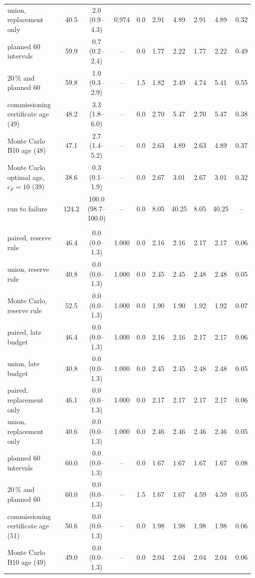\begin{table}[htbp]
\begin{tabular*}{\textwidth}{@{\extracolsep{\fill}}lccccccccc@{}}
union, replacement only & 40.5 & 2.0 (0.9--4.3) & 0.974 & 0.0 & 2.91 & 4.89 & 2.91 & 4.89 & 0.32 \\
planned 60 intervals & 59.9 & 0.7 (0.2--2.4) & -- & 0.0 & 1.77 & 2.22 & 1.77 & 2.22 & 0.49 \\
20\,\% and planned 60 & 59.8 & 1.0 (0.3--2.9) & -- & 1.5 & 1.82 & 2.49 & 4.74 & 5.41 & 0.55 \\
commissioning certificate age (49) & 48.2 & 3.3 (1.8--6.0) & -- & 0.0 & 2.70 & 5.47 & 2.70 & 5.47 & 0.38 \\
Monte Carlo B10 age (48) & 47.1 & 2.7 (1.4--5.2) & -- & 0.0 & 2.63 & 4.89 & 2.63 & 4.89 & 0.37 \\
Monte Carlo optimal age, $c_F=10$ (39) & 38.6 & 0.3 (0.1--1.9) & -- & 0.0 & 2.67 & 3.01 & 2.67 & 3.01 & 0.32 \\
run to failure & 124.2 & 100.0 (98.7--100.0) & -- & 0.0 & 8.05 & 40.25 & 8.05 & 40.25 & -- \\
\addlinespace
\multicolumn{10}{@{}l}{\textit{evidence, cruising}} \\
paired, reserve rule & 46.4 & 0.0 (0.0--1.3) & 1.000 & 0.0 & 2.16 & 2.16 & 2.17 & 2.17 & 0.06 \\
union, reserve rule & 40.8 & 0.0 (0.0--1.3) & 1.000 & 0.0 & 2.45 & 2.45 & 2.48 & 2.48 & 0.05 \\
Monte Carlo, reserve rule & 52.5 & 0.0 (0.0--1.3) & 1.000 & 0.0 & 1.90 & 1.90 & 1.92 & 1.92 & 0.07 \\
paired, late budget & 46.4 & 0.0 (0.0--1.3) & 1.000 & 0.0 & 2.16 & 2.16 & 2.17 & 2.17 & 0.06 \\
union, late budget & 40.8 & 0.0 (0.0--1.3) & 1.000 & 0.0 & 2.45 & 2.45 & 2.48 & 2.48 & 0.05 \\
paired, replacement only & 46.1 & 0.0 (0.0--1.3) & 1.000 & 0.0 & 2.17 & 2.17 & 2.17 & 2.17 & 0.06 \\
union, replacement only & 40.6 & 0.0 (0.0--1.3) & 1.000 & 0.0 & 2.46 & 2.46 & 2.46 & 2.46 & 0.05 \\
planned 60 intervals & 60.0 & 0.0 (0.0--1.3) & -- & 0.0 & 1.67 & 1.67 & 1.67 & 1.67 & 0.08 \\
20\,\% and planned 60 & 60.0 & 0.0 (0.0--1.3) & -- & 1.5 & 1.67 & 1.67 & 4.59 & 4.59 & 0.05 \\
commissioning certificate age (51) & 50.6 & 0.0 (0.0--1.3) & -- & 0.0 & 1.98 & 1.98 & 1.98 & 1.98 & 0.06 \\
Monte Carlo B10 age (49) & 49.0 & 0.0 (0.0--1.3) & -- & 0.0 & 2.04 & 2.04 & 2.04 & 2.04 & 0.06 \\

\end{tabular*}
\end{table}
